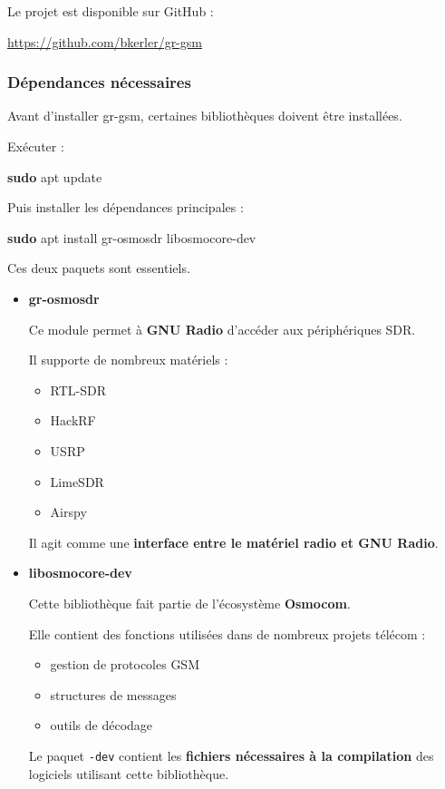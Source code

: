\documentclass[
  french,
]{article}
\newenvironment{Shaded}{\begin{snugshade}}{\end{snugshade}}
\newcommand{\FunctionTok}[1]{\textcolor[rgb]{0.13,0.29,0.53}{\textbf{#1}}}
\newcommand{\NormalTok}[1]{#1}
\providecommand{\tightlist}{%
  \setlength{\itemsep}{0pt}\setlength{\parskip}{0pt}}
\begin{document}
Le projet est disponible sur GitHub :

\url{https://github.com/bkerler/gr-gsm}

\subsubsection{Dépendances
nécessaires}\label{duxe9pendances-nuxe9cessaires}

Avant d'installer gr-gsm, certaines bibliothèques doivent être
installées.

Exécuter :

\begin{Shaded}
\begin{Highlighting}[]
\FunctionTok{sudo}\NormalTok{ apt update}
\end{Highlighting}
\end{Shaded}

Puis installer les dépendances principales :

\begin{Shaded}
\begin{Highlighting}[]
\FunctionTok{sudo}\NormalTok{ apt install gr{-}osmosdr libosmocore{-}dev}
\end{Highlighting}
\end{Shaded}

Ces deux paquets sont essentiels.

\begin{itemize}
\item
  \textbf{gr-osmosdr}

  Ce module permet à \textbf{GNU Radio} d'accéder aux périphériques SDR.

  Il supporte de nombreux matériels :

  \begin{itemize}
  \tightlist
  \item
    RTL-SDR
  \item
    HackRF
  \item
    USRP
  \item
    LimeSDR
  \item
    Airspy
  \end{itemize}

  Il agit comme une \textbf{interface entre le matériel radio et GNU
  Radio}.
\item
  \textbf{libosmocore-dev}

  Cette bibliothèque fait partie de l'écosystème \textbf{Osmocom}.

  Elle contient des fonctions utilisées dans de nombreux projets télécom
  :

  \begin{itemize}
  \tightlist
  \item
    gestion de protocoles GSM
  \item
    structures de messages
  \item
    outils de décodage
  \end{itemize}

  Le paquet \texttt{-dev} contient les \textbf{fichiers nécessaires à la
  compilation} des logiciels utilisant cette bibliothèque.
\end{itemize}
\end{document}
